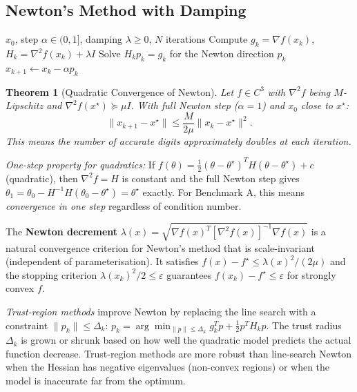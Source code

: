 \documentclass[11pt,a4paper]{article}
\newtheorem{theorem}{Theorem}[section]
\theoremstyle{definition}
\begin{document}
\subsection{Newton's Method with Damping}

\begin{algorithm}[H]
\caption{Newton's Method with Hessian Regularisation}
\label{alg:newton}
\begin{algorithmic}[1]
\Require $x_0$, step $\alpha \in (0,1]$, damping $\lambda \geq 0$, $N$ iterations
    \State Compute $g_k = \nabla f(x_k)$, $H_k = \nabla^2 f(x_k) + \lambda I$
    \State Solve $H_k p_k = g_k$ for the Newton direction $p_k$ 
    \State $x_{k+1} \gets x_k - \alpha p_k$ 
\EndFor
\end{algorithmic}
\end{algorithm}

\begin{theorem}[Quadratic Convergence of Newton]
Let $f \in C^3$ with $\nabla^2 f$ being $M$-Lipschitz and $\nabla^2 f(x^{\star}) \succeq \mu I$. With full Newton step ($\alpha = 1$) and $x_0$ close to $x^{\star}$:
\begin{equation}
\|x_{k+1} - x^{\star}\| \leq \frac{M}{2\mu}\|x_k - x^{\star}\|^2.
\end{equation}
This means the number of accurate digits approximately \emph{doubles} at each iteration.
\end{theorem}

\noindent\textit{One-step property for quadratics:} If $f(\theta) = \frac{1}{2}(\theta - \theta^{\star})^T H (\theta - \theta^{\star}) + c$ (quadratic), then $\nabla^2 f = H$ is constant and the full Newton step gives $\theta_1 = \theta_0 - H^{-1} H (\theta_0 - \theta^{\star}) = \theta^{\star}$ exactly. For Benchmark A, this means \emph{convergence in one step} regardless of condition number.

The \textbf{Newton decrement} $\lambda(x) = \sqrt{\nabla f(x)^T [\nabla^2 f(x)]^{-1} \nabla f(x)}$ is a natural convergence criterion for Newton's method that is scale-invariant (independent of parameterisation). It satisfies $f(x) - f^{\star} \leq \lambda(x)^2 / (2\mu)$ and the stopping criterion $\lambda(x_k)^2/2 \leq \varepsilon$ guarantees $f(x_k) - f^{\star} \leq \varepsilon$ for strongly convex $f$.

\noindent\textit{Trust-region methods} improve Newton by replacing the line search with a constraint $\|p_k\| \leq \Delta_k$: $p_k = \arg\min_{\|p\| \leq \Delta_k} g_k^T p + \frac{1}{2}p^T H_k p$. The trust radius $\Delta_k$ is grown or shrunk based on how well the quadratic model predicts the actual function decrease. Trust-region methods are more robust than line-search Newton when the Hessian has negative eigenvalues (non-convex regions) or when the model is inaccurate far from the optimum.
\end{document}
